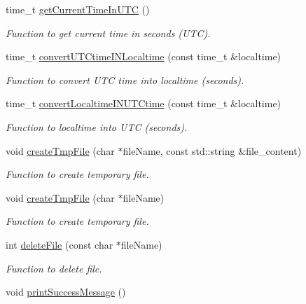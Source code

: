 \begin{DoxyCompactItemize}
time\_\-t \hyperlink{namespacevishnu_a34810356a494e9db0e924c76889474b0}{getCurrentTimeInUTC} ()
\begin{DoxyCompactList}\small\item\em Function to get current time in seconds (UTC). \item\end{DoxyCompactList}\item 
time\_\-t \hyperlink{namespacevishnu_a912b9d87fc92812a07bb7f6dce8dcb85}{convertUTCtimeINLocaltime} (const time\_\-t \&localtime)
\begin{DoxyCompactList}\small\item\em Function to convert UTC time into localtime (seconds). \item\end{DoxyCompactList}\item 
time\_\-t \hyperlink{namespacevishnu_a7607f0891ab382dcb2343a36d9b25190}{convertLocaltimeINUTCtime} (const time\_\-t \&localtime)
\begin{DoxyCompactList}\small\item\em Function to localtime into UTC (seconds). \item\end{DoxyCompactList}\item 
void \hyperlink{namespacevishnu_a33f3fca5bc294663e2863c1abc1da5c8}{createTmpFile} (char $\ast$fileName, const std::string \&file\_\-content)
\begin{DoxyCompactList}\small\item\em Function to create temporary file. \item\end{DoxyCompactList}\item 
void \hyperlink{namespacevishnu_a18002572e5b0039069544475365f335d}{createTmpFile} (char $\ast$fileName)
\begin{DoxyCompactList}\small\item\em Function to create temporary file. \item\end{DoxyCompactList}\item 
int \hyperlink{namespacevishnu_adccbbcf352ca9471d210e9d801c73e2d}{deleteFile} (const char $\ast$fileName)
\begin{DoxyCompactList}\small\item\em Function to delete file. \item\end{DoxyCompactList}\item 
\hypertarget{namespacevishnu_ab0ea8ccb86c430f6a602374c82f66d2e}{
void \hyperlink{namespacevishnu_ab0ea8ccb86c430f6a602374c82f66d2e}{printSuccessMessage} ()}
\label{namespacevishnu_ab0ea8ccb86c430f6a602374c82f66d2e}


\end{DoxyCompactItemize}
